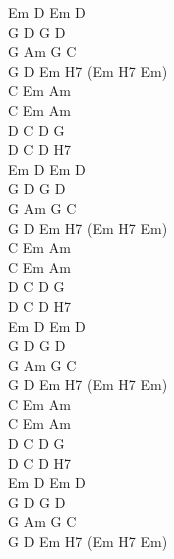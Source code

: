 \begin{chord}
Em D Em D\\
G D G D\\
G Am G C\\
G D Em H7 (Em H7 Em)\\

C Em Am\\
C Em Am\\
D C D G\\
D C D H7\\

Em D Em D\\
G D G D\\
G Am G C\\
G D Em H7 (Em H7 Em)\\

C Em Am\\
C Em Am\\
D C D G\\
D C D H7\\

Em D Em D\\
G D G D\\
G Am G C\\
G D Em H7 (Em H7 Em)\\

C Em Am\\
C Em Am\\
D C D G\\
D C D H7\\

Em D Em D\\
G D G D\\
G Am G C\\
G D Em H7 (Em H7 Em)\\
\end{chord}
